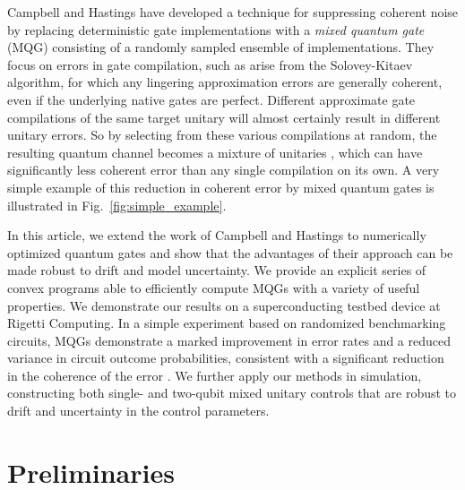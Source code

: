 \documentclass[aps,nofootinbib,pra,notitlepage,twocolumn]{revtex4-1}
\newcommand{\0}{\ensuremath{\mathbf{0}}}
\begin{document}
Campbell \cite{Campbell2017,1811.08017} and Hastings \cite{Hastings2017} have developed a technique for suppressing coherent noise by replacing deterministic gate implementations with a \emph{mixed quantum gate} (MQG) consisting of a randomly sampled ensemble of implementations. They focus on errors in gate compilation, such as arise from the Solovey-Kitaev algorithm, for which any lingering approximation errors are generally coherent, even if the underlying native gates are perfect. Different approximate gate compilations of the same target unitary will almost certainly result in different unitary errors. So by selecting from these various compilations at random, the resulting quantum channel becomes a mixture of unitaries \cite{DBLP:journals/corr/cs-CC-0012017}, which can have significantly less coherent error than any single compilation on its own. A very simple example of this reduction in coherent error by mixed quantum gates is illustrated in Fig.~\ref{fig:simple_example}. 

In this article, we extend the work of Campbell and Hastings to numerically optimized quantum gates and show that the advantages of their approach can be made robust to drift and model uncertainty. We provide an explicit series of convex programs able to efficiently compute MQGs with a variety of useful properties. We demonstrate our results on a superconducting testbed device at Rigetti Computing.  In a simple experiment based on randomized benchmarking circuits, MQGs demonstrate a marked improvement in error rates and a reduced variance in circuit outcome probabilities, consistent with a significant reduction in the coherence of the error \cite{Ball2016}. We further apply our methods in simulation, constructing both single- and two-qubit mixed unitary controls that are robust to drift and uncertainty in the control parameters.


\section{Preliminaries}
\label{sec:preliminaries}
\end{document}
